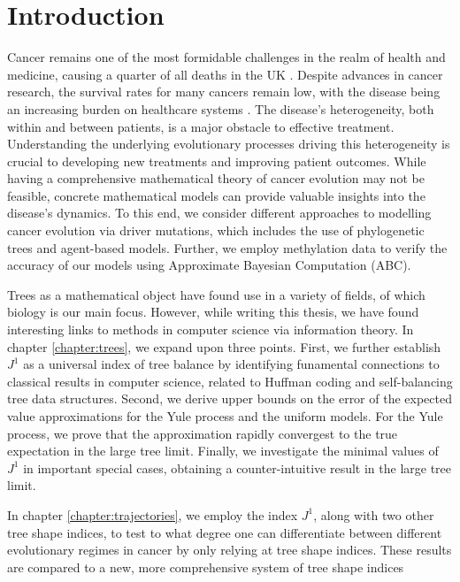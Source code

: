 \chapter{Introduction}\label{chapter:introduction}
Cancer remains one of the most formidable challenges in the realm of health and medicine, causing a quarter of all deaths in the UK \cite{noauthor_cancer_2015}.
Despite advances in cancer research, the survival rates for many cancers remain low, with the disease being an increasing burden on healthcare
systems \cite{noauthor_financial_nodate}. The disease's heterogeneity, both within and between patients, is a major obstacle to effective treatment. Understanding the
underlying evolutionary processes driving this heterogeneity is crucial to developing new treatments and improving patient outcomes.
While having a comprehensive mathematical theory of cancer evolution may not be feasible, concrete mathematical models can provide valuable insights into the
disease's dynamics. To this end, we consider different approaches to modelling cancer evolution via driver mutations, which includes the use of phylogenetic
trees and agent-based models. Further, we employ methylation data to verify the accuracy of our models using Approximate Bayesian Computation (ABC).\par
Trees as a mathematical object have found use in a variety of fields, of which biology is our main focus. However, while writing this thesis, we have found
interesting links to methods in computer science via information theory.
In chapter \ref{chapter:trees}, we expand upon three points. First, we further establish $J^1$ as a
universal index of tree balance by identifying funamental connections to classical results in
computer science, related to Huffman coding and self-balancing tree data structures. Second, we derive
upper bounds on the error of the expected value approximations for the Yule process and the uniform models.
For the Yule process, we prove that the approximation rapidly convergest to the true expectation in the
large tree limit. Finally, we investigate the minimal values of $J^1$ in important special cases,
obtaining a counter-intuitive result in the large tree limit.\par
In chapter \ref{chapter:trajectories}, we employ the index $J^1$, along with two other tree shape indices, to
test to what degree one can differentiate between different evolutionary regimes in cancer by only relying at
tree shape indices. These results are compared to a new, more comprehensive system of tree shape indices \cite{noble_new_2023}
